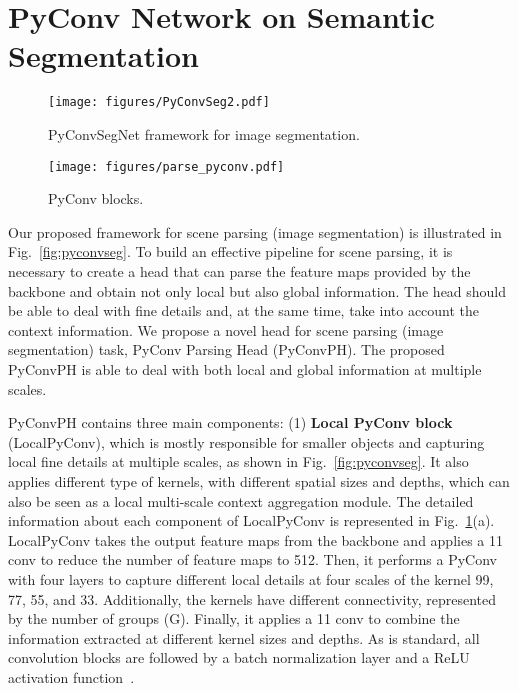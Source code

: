 \documentclass{article}
\begin{document}
\section{PyConv Network on Semantic Segmentation\label{sec:pyconvseg}}

\renewcommand{\arraystretch}{1}
\addtolength{\tabcolsep}{-2pt}
\begin{figure}[t]
\parbox{0.74\textwidth}{
  \centering
  \texttt{[image: figures/PyConvSeg2.pdf]}
  \caption{PyConvSegNet framework for image segmentation. \label{fig:pyconvseg}}}\parbox{0.28\textwidth}{
  \centering
  \texttt{[image: figures/parse\_pyconv.pdf]}
  \caption{PyConv blocks. \label{fig:parse_pyconv}}}
\end{figure}
\addtolength{\tabcolsep}{2pt}
\renewcommand{\arraystretch}{1}

Our proposed framework for scene parsing (image segmentation) is illustrated in Fig.~\ref{fig:pyconvseg}.  To build an effective pipeline for scene parsing, it is necessary to create a head that can parse the feature maps provided by the backbone and obtain not only local but also global information.  The head should be able to deal with fine details and, at the same time, take into account the context information. We propose a novel head for scene parsing (image segmentation) task, PyConv Parsing Head (PyConvPH). The proposed  PyConvPH is able to deal with both local and global information at multiple scales.

PyConvPH contains three main components: (1) {\bf Local PyConv block} (LocalPyConv), which is mostly responsible for smaller objects and  capturing local fine details at multiple scales, as shown in Fig.~\ref{fig:pyconvseg}. It also applies  different type of kernels, with different spatial sizes and depths, which can also be seen as a local multi-scale context aggregation module. The detailed information about each component of LocalPyConv is represented in Fig.~\ref{fig:parse_pyconv}(a). LocalPyConv takes the output feature maps from the backbone and applies a 11 conv to reduce the number of feature maps to 512. Then, it performs a PyConv with four layers to capture different local details at four scales of the kernel  99,  77, 55, and 33. Additionally,  the kernels have different connectivity, represented by the number of groups (G). Finally, it applies a 11 conv to combine the information extracted at different kernel sizes and depths. As is standard, all convolution blocks are followed by a batch normalization layer \cite{ioffe2015batch} and a ReLU activation function~\cite{nair2010rectified}.
\end{document}
